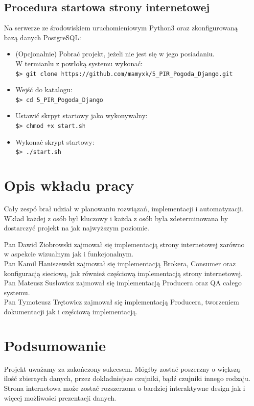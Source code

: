 \documentclass[12pt,a4paper]{article}
\begin{document}
    \subsection{Procedura startowa strony internetowej}
    Na serwerze ze środowiskiem uruchomieniowym Python3 oraz zkonfigurowaną bazą danych PostgreSQL:
    \begin{itemize}
        \item (Opcjonalnie) Pobrać projekt, jeżeli nie jest się w jego posiadaniu. \\ W termianlu z powłoką systemu wykonać:\\ \texttt{\$> git clone https://github.com/mamyxk/5\_PIR\_Pogoda\_Django.git}
        \item Wejść do katalogu: \\\texttt{\$> cd 5\_PIR\_Pogoda\_Django}
        \item Ustawić skrpyt startowy jako wykonywalny:\\ \texttt{\$> chmod +x start.sh}
        \item Wykonać skrypt startowy: \\ \texttt{\$> ./start.sh}
    \end{itemize}

    \section{Opis wkładu pracy}
    Cały zespó brał udział w planowaniu rozwiązań, implementacji i automatyzacji. Wkład każdej z osób był kluczowy i każda z osób była zdeterminowana by dostarczyć projekt na jak najwyższym poziomie.

    \vspace*{3mm}

    \noindent
    Pan Dawid Ziobrowski zajmował się implementacją strony internetowej zarówno w aspekcie wizualnym jak i funkcjonalnym.
    \\Pan Kamil Haniszewski zajmował się implementacją Brokera, Consumer oraz konfiguracją sieciową, jak również częściową implementacją strony internetowej.
    \\Pan Mateusz Susłowicz zajmował się implementacją Producera oraz QA całego systemu.
    \\Pan Tymoteusz Trętowicz zajmował się implementacją Producera, tworzeniem dokumentacji jak i częściową implementacją.

    \pagebreak
    \section{Podsumowanie}
    Projekt uważamy za zakończony sukcesem. Mógłby zostać poszerzny o większą ilość zbieraych danych, przez dokładniejsze czujniki, bądź czujniki innego rodzaju. Strona internetowa może zostać rozszerzona o bardziej interaktywne design jak i więcej możliwości prezentacji danych.
\end{document}
